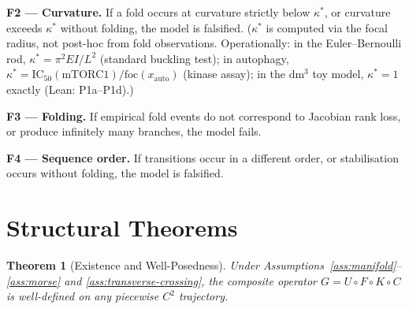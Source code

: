 \documentclass[14pt,a4paper]{extarticle}
\newtheorem{theorem}{Theorem}[section]
\begin{document}
\textbf{F2 --- Curvature.}
If a fold occurs at curvature strictly below $\kappa^*$, or curvature
exceeds $\kappa^*$ without folding, the model is falsified.
($\kappa^*$ is computed via the focal radius, not post-hoc from fold
observations. Operationally: in the Euler--Bernoulli rod,
$\kappa^* = \pi^2 EI/L^2$ (standard buckling test); in autophagy,
$\kappa^* = \mathrm{IC}_{50}(\text{mTORC1})/\mathrm{foc}(x_\mathrm{auto})$
(kinase assay); in the dm$^3$ toy model, $\kappa^*=1$ exactly
(Lean: P1a--P1d).)

\textbf{F3 --- Folding.}
If empirical fold events do not correspond to Jacobian rank loss,
or produce infinitely many branches, the model fails.

\textbf{F4 --- Sequence order.}
If transitions occur in a different order, or stabilisation occurs
without folding, the model is falsified.

\section{Structural Theorems}
\label{sec:theorems}

\begin{theorem}[Existence and Well-Posedness]
\label{thm:existence}
Under Assumptions~\ref{ass:manifold}--\ref{ass:morse} and
\ref{ass:transverse-crossing}, the composite
operator $G = U \circ F \circ K \circ C$ is well-defined on any
piecewise $C^2$ trajectory.
\end{theorem}
\end{document}
